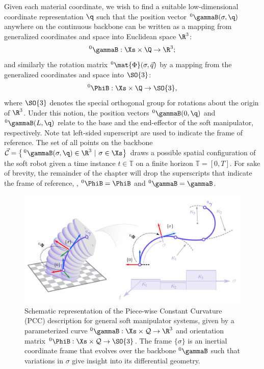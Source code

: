 Given each material coordinate, we wish to find a suitable low-dimensional  coordinate representation $\q$ such that the position vector $^0\gammaB(\sigma,\q)$ anywhere on the continuous backbone can be written as a mapping from generalized coordinates and space into Euclidean space $\R^3$:
%
\begin{equation}
^0\gammaB: \Xs \times \Q \to \R^3;
\end{equation}
%
and similarly the rotation matrix $^0\mat{\Phi}(\sigma,\vec{q})$ by a mapping from the generalized coordinates and space into $\SO{3}$:
%
\begin{equation}
^0\PhiB: \Xs \times \Q \to \SO{3}, \label{eq:phi_map}
\end{equation}
%
where {$\SO{3}$ denotes the special orthogonal group for rotations about the origin of $\R^3$}. Under this notion, the position vectors $^0\gammaB(0,\q)$ and $^0\gammaB(L,\q)$ relate to the base and the end-effector of the soft  manipulator, respectively. {Note tat left-sided superscript are used to indicate the frame of reference.} The set of all points on the backbone $\vec{\mathcal{C}} = \left\{\,^0\gammaB(\sigma,\q) \in \R^3~|~\sigma \in \Xs \right\}$ draws a possible {spatial} configuration of the soft robot given {a time instance $t \in \mathbb{T}$ on a finite horizon $\mathbb{T} = [0,T]$}.  For sake of brevity, the remainder of the chapter will drop the superscripts that indicate the frame of reference, \ie, $^0\PhiB = \PhiB$ and $^0\gammaB = \gammaB$.
%
\begin{figure}[!t]
  \vspace{-3mm}
  \centering
  \includegraphics[width = \textwidth]{./pdf/thesis-figure-4-2.pdf}
  \caption{Schematic representation of the Piece-wise Constant Curvature (PCC) description for general soft  manipulator systems, given by a parameterized curve $^0 \gammaB: \Xs \times \mathcal{Q} \to \R^3$ and orientation matrix $^0 \PhiB: \Xs \times \mathcal{Q} \to \SO{3}$. The frame $\{\sigma\}$ is an inertial coordinate frame that evolves over the backbone $^0 \gammaB$ such that variations in $\sigma$ give insight into its differential geometry.}
  \label{fig:C2:configuration}
\end{figure}
